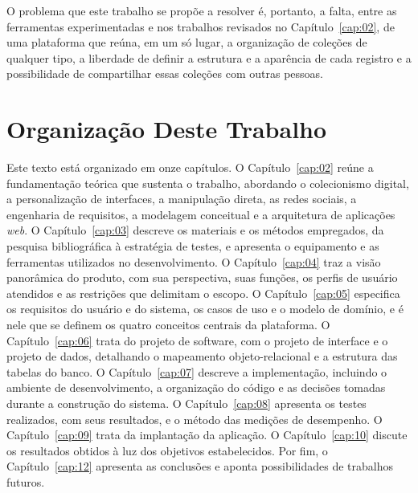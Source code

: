 O problema que este trabalho se propõe a resolver é, portanto, a falta, entre as ferramentas experimentadas e nos trabalhos revisados no Capítulo~\ref{cap:02}, de uma plataforma que reúna, em um só lugar, a organização de coleções de qualquer tipo, a liberdade de definir a estrutura e a aparência de cada registro e a possibilidade de compartilhar essas coleções com outras pessoas.

\section{Organização Deste Trabalho}

Este texto está organizado em onze capítulos. O Capítulo~\ref{cap:02} reúne a fundamentação teórica que sustenta o trabalho, abordando o colecionismo
digital, a personalização de interfaces, a manipulação direta, as redes sociais, a engenharia de requisitos, a modelagem conceitual e a arquitetura de
aplicações \textit{web}. O Capítulo~\ref{cap:03} descreve os materiais e os métodos empregados, da pesquisa bibliográfica à estratégia de testes, e apresenta
o equipamento e as ferramentas utilizados no desenvolvimento. O Capítulo~\ref{cap:04} traz a visão panorâmica do produto, com sua perspectiva, suas funções,
os perfis de usuário atendidos e as restrições que delimitam o escopo. O Capítulo~\ref{cap:05} especifica os requisitos do usuário e do sistema, os casos de
uso e o modelo de domínio, e é nele que se definem os quatro conceitos centrais da plataforma. O Capítulo~\ref{cap:06} trata do projeto de software, com o
projeto de interface e o projeto de dados, detalhando o mapeamento objeto-relacional e a estrutura das tabelas do banco. O Capítulo~\ref{cap:07} descreve a
implementação, incluindo o ambiente de desenvolvimento, a organização do código e as decisões tomadas durante a construção do sistema. O
Capítulo~\ref{cap:08} apresenta os testes realizados, com seus resultados, e o método das medições de desempenho. O Capítulo~\ref{cap:09} trata da implantação da aplicação. O Capítulo~\ref{cap:10}
discute os resultados obtidos à luz dos objetivos estabelecidos. Por fim, o Capítulo~\ref{cap:12} apresenta as conclusões e aponta possibilidades de
trabalhos futuros.
